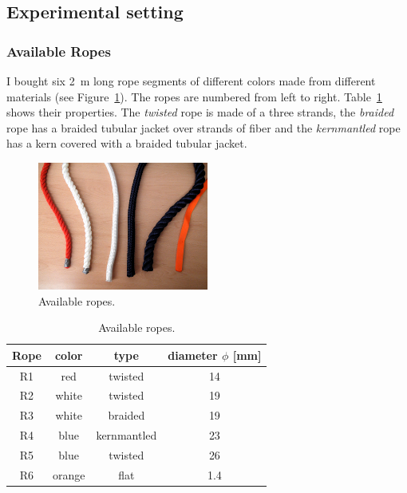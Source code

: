     \subsection{Experimental setting}

        \subsubsection{Available Ropes} \label{sec:AvailableRopes}
            I bought six \SI{2}{m} long rope segments of different colors made from different materials (see Figure~\ref{fig:AvailableRopes}). The ropes are numbered from left to right. Table~\ref{table:AvailableRopes} shows their properties. The \emph{twisted} rope is made of a three strands, the \emph{braided} rope has a braided tubular jacket over strands of fiber and the \emph{kernmantled} rope has a kern covered with a braided tubular jacket.

            \begin{figure}
            \includegraphics[width=0.5\textwidth]{RopesAdj.png}
            \centering
            \caption{Available ropes.}
            \label{fig:AvailableRopes}
            \end{figure}

            \begin{table}\centering
            \begin{tabular}{@{}cccc@{}}\toprule
            Rope & color & type & diameter $\phi$ [mm]\\ \midrule
            R1 & red & twisted & 14\\
            R2 & white & twisted & 19\\
            R3 & white & braided & 19\\
            R4 & blue & kernmantled & 23\\
            R5 & blue & twisted & 26\\
            R6 & orange & flat & 1.4\\
            \end{tabular}
            \caption{Available ropes.}
            \label{table:AvailableRopes}
            \end{table}


